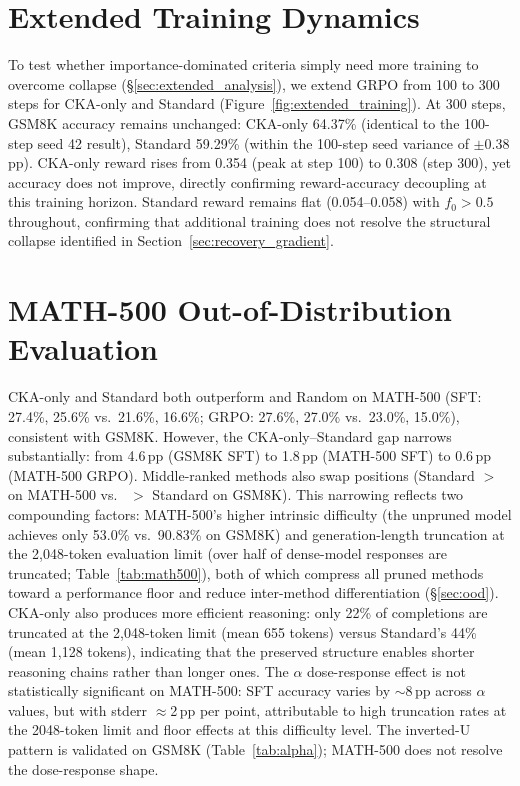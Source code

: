 \section{Extended Training Dynamics}
\label{sec:appendix_extended}

To test whether importance-dominated criteria simply need more training to overcome collapse (\S\ref{sec:extended_analysis}), we extend GRPO from 100 to 300 steps for CKA-only and Standard (Figure~\ref{fig:extended_training}).
At 300 steps, GSM8K accuracy remains unchanged: CKA-only 64.37\% (identical to the 100-step seed 42 result), Standard 59.29\% (within the 100-step seed variance of $\pm$0.38\,pp).
CKA-only reward rises from 0.354 (peak at step 100) to 0.308 (step 300), yet accuracy does not improve, directly confirming reward-accuracy decoupling at this training horizon.
Standard reward remains flat (0.054--0.058) with $f_0 > 0.5$ throughout, confirming that additional training does not resolve the structural collapse identified in Section~\ref{sec:recovery_gradient}.

\section{MATH-500 Out-of-Distribution Evaluation}
\label{sec:appendix_math500}



CKA-only and Standard both outperform \rasp{} and Random on MATH-500 (SFT: 27.4\%, 25.6\% vs.\ 21.6\%, 16.6\%; GRPO: 27.6\%, 27.0\% vs.\ 23.0\%, 15.0\%), consistent with GSM8K.
However, the CKA-only--Standard gap narrows substantially: from 4.6\,pp (GSM8K SFT) to 1.8\,pp (MATH-500 SFT) to 0.6\,pp (MATH-500 GRPO).
Middle-ranked methods also swap positions (Standard $>$ \rasp{} on MATH-500 vs.\ \rasp{} $>$ Standard on GSM8K).
This narrowing reflects two compounding factors: MATH-500's higher intrinsic difficulty (the unpruned model achieves only 53.0\% vs.\ 90.83\% on GSM8K) and generation-length truncation at the 2{,}048-token evaluation limit (over half of dense-model responses are truncated; Table~\ref{tab:math500}), both of which compress all pruned methods toward a performance floor and reduce inter-method differentiation (\S\ref{sec:ood}).
CKA-only also produces more efficient reasoning: only 22\% of completions are truncated at the 2{,}048-token limit (mean 655 tokens) versus Standard's 44\% (mean 1{,}128 tokens), indicating that the preserved structure enables shorter reasoning chains rather than longer ones.
The $\alpha$ dose-response effect is not statistically significant on MATH-500: SFT accuracy varies by ${\sim}$8\,pp across $\alpha$ values, but with stderr ${\approx}$2\,pp per point, attributable to high truncation rates at the 2048-token limit and floor effects at this difficulty level.
The inverted-U pattern is validated on GSM8K (Table~\ref{tab:alpha}); MATH-500 does not resolve the dose-response shape.

